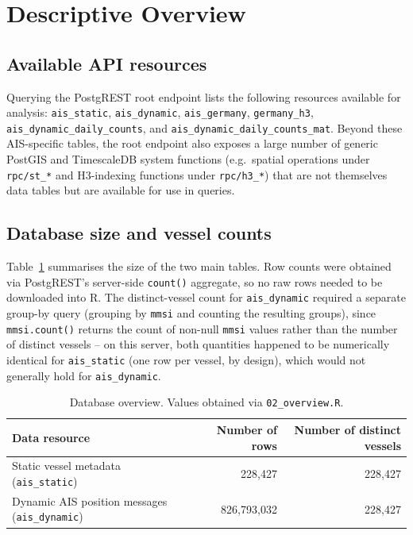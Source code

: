 \documentclass[11pt,a4paper]{article}
\begin{document}
\section{Descriptive Overview}
\label{sec:overview}

\subsection{Available API resources}

Querying the PostgREST root endpoint lists the following resources available for
analysis: \texttt{ais\_static}, \texttt{ais\_dynamic}, \texttt{ais\_germany},
\texttt{germany\_h3}, \texttt{ais\_dynamic\_daily\_counts}, and
\texttt{ais\_dynamic\_daily\_counts\_mat}. Beyond these AIS-specific tables,
the root endpoint also exposes a large number of generic PostGIS and
TimescaleDB system functions (e.g.\ spatial operations under \texttt{rpc/st\_*}
and H3-indexing functions under \texttt{rpc/h3\_*}) that are not themselves
data tables but are available for use in queries.

\subsection{Database size and vessel counts}

Table~\ref{tab:overview} summarises the size of the two main tables. Row counts
were obtained via PostgREST's server-side \texttt{count()} aggregate, so no raw
rows needed to be downloaded into R. The distinct-vessel count for
\texttt{ais\_dynamic} required a separate group-by query (grouping by
\texttt{mmsi} and counting the resulting groups), since
\texttt{mmsi.count()} returns the count of non-null \texttt{mmsi} values
rather than the number of distinct vessels -- on this server, both quantities
happened to be numerically identical for \texttt{ais\_static} (one row per
vessel, by design), which would not generally hold for \texttt{ais\_dynamic}.

\begin{table}[h]
  \centering
  \caption{Database overview. Values obtained via \texttt{02\_overview.R}.}
  \label{tab:overview}
  \begin{tabular}{lrr}
    \toprule
    Data resource & Number of rows & Number of distinct vessels \\
    \midrule
    Static vessel metadata (\texttt{ais\_static}) & 228{,}427 & 228{,}427 \\
    Dynamic AIS position messages (\texttt{ais\_dynamic}) & 826{,}793{,}032 & 228{,}427 \\
    \bottomrule
  \end{tabular}
\end{table}
\end{document}
